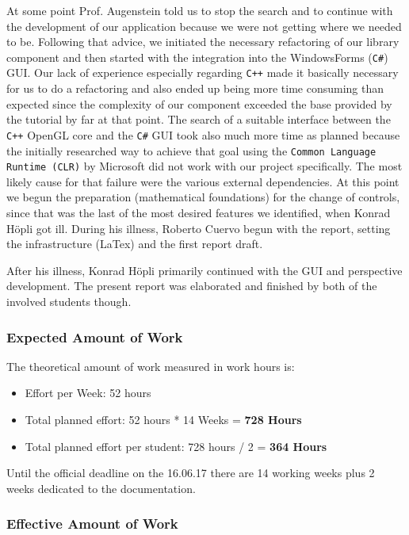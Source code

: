 At some point Prof. Augenstein told us to stop the search and to continue with the development of our application because we were not getting where we needed to be. Following that advice, we initiated the necessary refactoring of our library component and then started with the integration into the WindowsForms (\verb|C#|) GUI. 
Our lack of experience especially regarding \verb|C++| made it basically necessary for us to do a refactoring and also ended up being more time consuming than expected since the complexity of our component exceeded the base provided by the tutorial by far at that point.
The search of a suitable interface between the \verb|C++| OpenGL core and the \verb|C#| GUI took also much more time as planned because the initially researched way to achieve that goal using the \verb|Common Language Runtime (CLR)| by Microsoft did not work with our project specifically. The most likely cause for that failure were the various external dependencies. 
At this point we begun the preparation (mathematical foundations) for the change of controls, since that was the last of the most desired features we identified, when Konrad H\"opli got ill. During his illness, Roberto Cuervo begun with the report, setting the infrastructure (LaTex) and the first report draft. 

After his illness, Konrad H\"opli primarily continued with the GUI and perspective development. The present report was elaborated and finished by both of the involved students though.


\subsubsection{Expected Amount of Work}

The theoretical amount of work measured in work hours is:

\begin{itemize}
	\item Effort per Week: 52 hours
	\item Total planned effort: 52 hours * 14 Weeks = \textbf{728 Hours}
	\item Total planned effort per student: 728 hours / 2 = \textbf{364 Hours}
\end{itemize}

Until the official deadline on the 16.06.17 there are 14 working weeks plus 2 weeks dedicated to the documentation.

\subsubsection{Effective Amount of Work}

